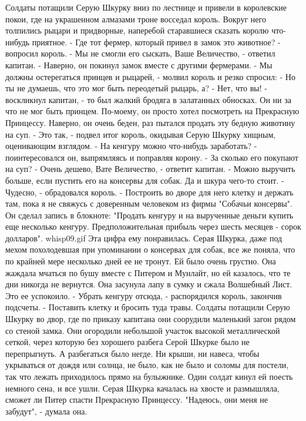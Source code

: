     Солдаты потащили Серую Шкурку вниз по лестнице и привели в 
королевские покои, где на украшенном алмазами троне восседал король. 
Вокруг него толпились рыцари и придворные, наперебой старавшиеся 
сказать королю что-нибудь приятное.
    - Где тот фермер, который привел в замок это животное? - вопросил 
король.
    - Мы не смогли его сыскать, Ваше Величество, - ответил капитан. - 
Наверно, он покинул замок вместе с другими фермерами.
    - Мы должны остерегаться принцев и рыцарей, - молвил король и 
резко спросил: - Но ты не думаешь, что это мог быть переодетый рыцарь, 
а?
    - Нет, что вы! - воскликнул капитан, - то был жалкий бродяга в 
залатанных обносках. Он ни за что не мог быть принцем. По-моему, он 
просто хотел посмотреть на Прекрасную Принцессу. Наверно, он очень 
беден, раз пытался продать эту бедную животину на суп.
    - Это так, - подвел итог король, окидывая Серую Шкурку хищным, 
оценивающим взглядом. - На кенгуру можно что-нибудь заработать? - 
поинтересовался он, выпрямляясь и поправляя корону. - За сколько его 
покупают на суп?
    - Очень дешево, Вате Величество, - ответит капитан. - Можно 
выручить больше, если пустить его на консервы для собак. Да и шкура 
чего-то стоит.
    - Чудесно, - обрадовался король. - Построить во дворе для него 
клетку и держать там, пока я не свяжусь с доверенным человеком из 
фирмы "Собачьи консервы".
    Он сделал запись в блокноте: "Продать кенгуру и на вырученные 
деньги купить еще несколько кенгуру. Предположительная прибыль через 
шесть месяцев - сорок долларов".
    {whisp09.gif}
    Эта цифра ему понравилась. Серая Шкурка, даже под мехом 
похолодевшая при упоминании о консервах для собак, все же поняла, что 
по крайней мере несколько дней ее не тронут.
    Ей было очень грустно. Она жаждала мчаться по бушу вместе с 
Питером и Мунлайт, но ей казалось, что те дни никогда не вернутся. Она 
засунула лапу в сумку и сжала Волшебный Лист. Это ее успокоило.
    - Убрать кенгуру отсюда, - распорядился король, закончив подсчеты. 
- Поставить клетку и бросить туда травы.
    Солдаты потащили Серую Шкурку во двор, где по приказу капитана они 
соорудили маленький загон рядом со стеной замка. Они огородили 
небольшой участок высокой металлической сеткой, через которую без 
хорошего разбега Серой Шкурке было не перепрыгнуть. А разбегаться было 
негде. Ни крыши, ни навеса, чтобы укрываться от дождя или солнца, не 
было, как не было и соломы для постели, так что лежать приходилось 
прямо на булыжнике.
    Один солдат кинул ей поесть немного сена, и все ушли.
    Серая Шкурка качалась на хвосте и размышляла, сможет ли Питер 
спасти Прекрасную Принцессу.
    "Надеюсь, они меня не забудут", - думала она.

